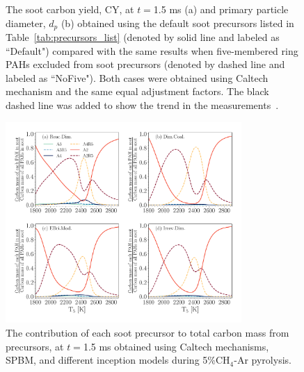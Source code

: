 \begin{figure}[H]
	\centering
	\caption{The soot carbon yield, CY, at $t=$1.5 ms (a) and primary particle diameter, $d_p$ (b) obtained using the default soot precursors listed in Table~\ref{tab:precursors_list} (denoted by solid line and labeled as ``Default") compared with the same results when five-membered ring PAHs  excluded from soot precursors (denoted by dashed line and labeled as ``NoFive"). Both cases were obtained using Caltech mechanism and the same equal adjustment factors. The black dashed line was added to show the trend in the measurements~\citep{agafonov2016unified}.}
	\label{fig:shockagof_yieldspc_cpr} 
\end{figure}

\begin{figure}[H]
	\centering
	\includegraphics[width=0.8\textwidth]{Figures/Results/Shocktube/Agafonov2016_cpr/c_dist_spc.pdf}
	\caption{The contribution of each soot precursor to total carbon mass from precursors, at $t=$1.5 ms obtained using Caltech mechanisms, SPBM, and different inception models during 5\%$\mathrm{CH_4}$-Ar pyrolysis.}
	\label{fig:shockagof_spccont_cpr} 
\end{figure}

